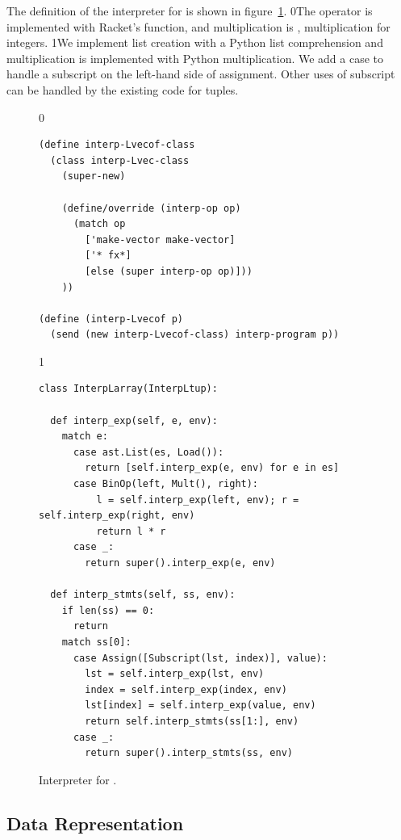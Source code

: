 \documentclass[7x10]{TimesAPriori_MIT}%
\def\racketEd{0}
\def\pythonEd{1}
\def\edition{0}
\newcommand{\racket}[1]{{\if\edition\racketEd{#1}\fi}}
\newcommand{\python}[1]{{\if\edition\pythonEd #1\fi}}
\numberwithin{theorem}{chapter}
\numberwithin{definition}{chapter}
\numberwithin{equation}{chapter}
\begin{document}
The definition of the interpreter for \LangArray{} is shown in
figure~\ref{fig:interp-Lvecof}.
\racket{The  operator is
implemented with Racket's \code{make-vector} function, and
multiplication is \code{fx*}, multiplication for \code{fixnum}
integers.}
%
\python{We implement list creation with a Python list comprehension
  and multiplication is implemented with Python multiplication.  We
  add a case to handle a subscript on the left-hand side of
  assignment. Other uses of subscript can be handled by the existing
  code for tuples.}

\begin{figure}[tbp]
  \begin{tcolorbox}[colback=white]
{\if\edition\racketEd    
\begin{lstlisting}[basicstyle=\ttfamily\footnotesize]
(define interp-Lvecof-class
  (class interp-Lvec-class
    (super-new)

    (define/override (interp-op op)
      (match op
        ['make-vector make-vector]
        ['* fx*]
        [else (super interp-op op)]))
    ))

(define (interp-Lvecof p)
  (send (new interp-Lvecof-class) interp-program p))
\end{lstlisting}
    \fi}
{\if\edition\pythonEd
\begin{lstlisting}[basicstyle=\ttfamily\footnotesize]
class InterpLarray(InterpLtup):

  def interp_exp(self, e, env):
    match e:
      case ast.List(es, Load()):
        return [self.interp_exp(e, env) for e in es]
      case BinOp(left, Mult(), right):
          l = self.interp_exp(left, env); r = self.interp_exp(right, env)
          return l * r
      case _:
        return super().interp_exp(e, env)

  def interp_stmts(self, ss, env):
    if len(ss) == 0:
      return
    match ss[0]:
      case Assign([Subscript(lst, index)], value):
        lst = self.interp_exp(lst, env)
        index = self.interp_exp(index, env)
        lst[index] = self.interp_exp(value, env)
        return self.interp_stmts(ss[1:], env)
      case _:
        return super().interp_stmts(ss, env)
\end{lstlisting}
\fi}
  \end{tcolorbox}

  \caption{Interpreter for \LangArray{}.}
\label{fig:interp-Lvecof}
\end{figure}


\subsection{Data Representation}
\label{sec:array-rep}
\end{document}
